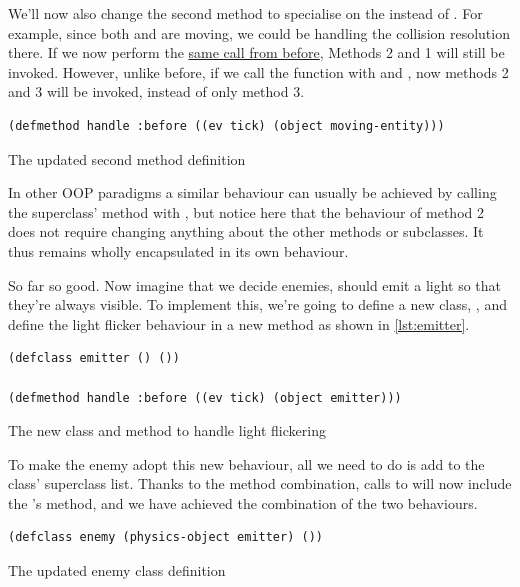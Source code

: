 \documentclass[a4paper]{paper}
\begin{document}
We'll now also change the second method to specialise on the  instead of . For example, since both  and  are moving, we could be handling the collision resolution there. If we now perform the \hyperlink{first-call}{same call from before}, Methods 2 and 1 will still be invoked. However, unlike before, if we call the function with  and , now methods 2 and 3 will be invoked, instead of only method 3.

\begin{listing}[h]
\begin{verbatim}
(defmethod handle :before ((ev tick) (object moving-entity)))
\end{verbatim}
\caption{The updated second method definition}
\label{lst:updated method}
\end{listing}

In other OOP paradigms a similar behaviour can usually be achieved by calling the superclass' method with , but notice here that the behaviour of method 2 does not require changing anything about the other methods or subclasses. It thus remains wholly encapsulated in its own behaviour.

So far so good. Now imagine that we decide enemies, should emit a light so that they're always visible. To implement this, we're going to define a new class, , and define the light flicker behaviour in a new  method as shown in \autoref{lst:emitter}.

\begin{listing}[h]
\begin{verbatim}
(defclass emitter () ())

(defmethod handle :before ((ev tick) (object emitter)))
\end{verbatim}
\caption{The new class and method to handle light flickering}
\label{lst:emitter}
\end{listing}

To make the enemy adopt this new behaviour, all we need to do is add  to the  class' superclass list. Thanks to the method combination, calls to  will now include the 's method, and we have achieved the combination of the two behaviours.

\begin{listing}[H]
\begin{verbatim}
(defclass enemy (physics-object emitter) ())
\end{verbatim}
\caption{The updated enemy class definition}
\label{lst:new-enemy}
\end{listing}
\end{document}
